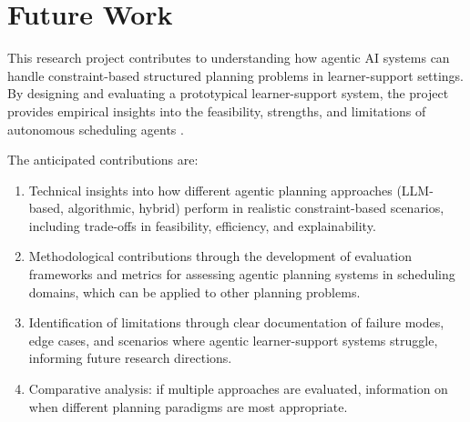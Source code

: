 \documentclass[12pt]{article}
\begin{document}
\section{Future Work}

This research project contributes to understanding how agentic AI systems can handle constraint-based structured planning problems in learner-support settings. By designing and evaluating a prototypical learner-support system, the project provides empirical insights into the feasibility, strengths, and limitations of autonomous scheduling agents \parencite{wang2024survey}.

The anticipated contributions are:

\begin{enumerate}
    \item Technical insights into how different agentic planning approaches (LLM-based, algorithmic, hybrid) perform in realistic constraint-based scenarios, including trade-offs in feasibility, efficiency, and explainability.

    \item Methodological contributions through the development of evaluation frameworks and metrics for assessing agentic planning systems in scheduling domains, which can be applied to other planning problems.

    \item Identification of limitations through clear documentation of failure modes, edge cases, and scenarios where agentic learner-support systems struggle, informing future research directions.

    \item Comparative analysis: if multiple approaches are evaluated, information on when different planning paradigms are most appropriate.
\end{enumerate}
\end{document}
